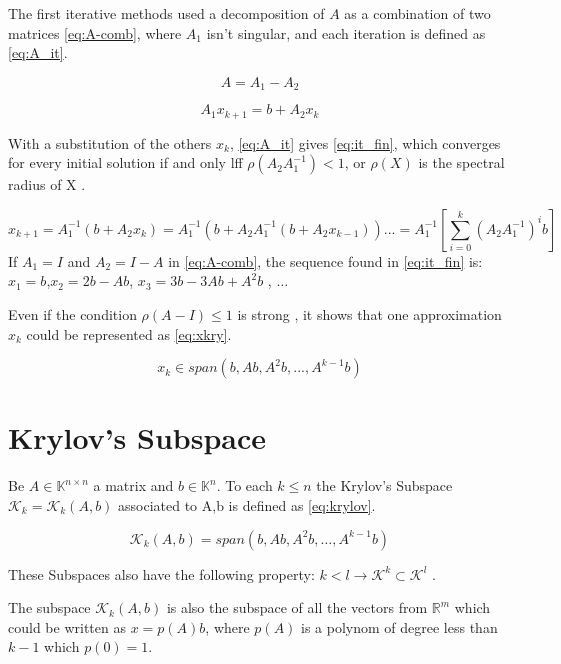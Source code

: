 The first iterative methods used a decomposition of $A$ as a combination of two matrices \ref{eq:A-comb}, where $A_{1}$ isn't singular, and each iteration is defined as \ref{eq:A_it}.

\begin{equation}\label{eq:A-comb}
    A = A_{1} - A_{2}
\end{equation}

\begin{equation}\label{eq:A_it}
    A_{1} x_{k+1} = b + A_{2}x_{k}
\end{equation}

With a substitution of the others $x_{k}$, \ref{eq:A_it} gives \ref{eq:it_fin}, which converges for every initial solution if and only lff $\rho(A_{2}A_{1}^{-1}) < 1$, or $\rho(X)$ is the spectral radius of X \cite{bonnet}.

\begin{equation}\label{eq:it_fin}
    x_{k+1} = A_{1}^{-1}(b + A_{2}x_{k}) = A_{1}^{-1}(b + A_{2}A_{1}^{-1}(b + A_{2}x_{k-1}))... = A_{1}^{-1} \left[ \sum_{i=0}^{k} (A_{2}A_{1}^{-1})^{i}b\right]
\end{equation}
If $A_{1} = I$ and $A_{2} = I - A$ in \ref{eq:A-comb}, the sequence found in \ref{eq:it_fin} is: $x_{1} = b$,$x_{2} = 2b- Ab$, $x_{3} = 3b-3Ab+A^{2}b$ , $\dots$

Even if the condition $\rho(A-I) \leq 1$ is strong \cite{bonnet}, it shows that one approximation $x_{k}$ could be represented as \ref{eq:xkry}.

\begin{equation}\label{eq:xkry}
    x_{k} \in span(b,Ab,A^{2}b,...,A^{k-1}b)
\end{equation}

\section{Krylov's Subspace}
Be $A \in \mathbb{K}^{n \times n}$ a matrix and $b\in \mathbb{K}^{n}$. To each $k\leq n$ the Krylov's Subspace $\mathcal{K}_{k}=\mathcal{K}_{k}(A,b)$ associated to A,b is defined as \ref{eq:krylov}.

\begin{equation}\label{eq:krylov}
    \mathcal{K}_{k}(A,b) = span(b,Ab,A^{2}b,\dots , A^{k-1}b)
\end{equation}

These Subspaces also have the following property: $k<l \to \mathcal{K}^{k} \subset \mathcal{K}^{l}$ \cite{bonnet}.

The subspace $\mathcal{K}_{k}(A,b)$ is also the subspace of all the vectors from $\mathbb{R}^{m}$ which could be written as $x=p(A)b$, where $p(A)$ is a polynom of degree less than $k-1$ which $p(0)=1$.


